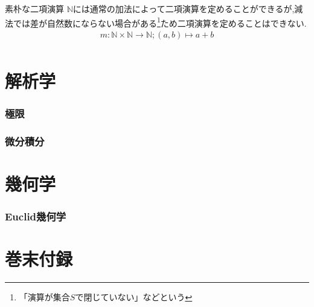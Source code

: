 \documentclass[hyperref,a4paper,12pt]{kininaruki}
\begin{document}
\begin{itembox}[l]{素朴な二項演算}
	$\mathbb{N}$には通常の加法によって二項演算を定めることができるが,減法では差が自然数にならない場合がある\footnote{%
	「演算が集合$S$で閉じていない」などという}ため二項演算を定めることはできない.
	\begin{align}
		m:\mathbb{N}\times{}\mathbb{N}\longrightarrow{}\mathbb{N}; (a, b)\longmapsto{}a+b\\
	\end{align}
\end{itembox}













\newpage
\part{解析学}
\section{極限}
\newpage
\section{微分積分}
\newpage
\part{幾何学}
\section{Euclid幾何学}
\part{巻末付録}
\end{document}
